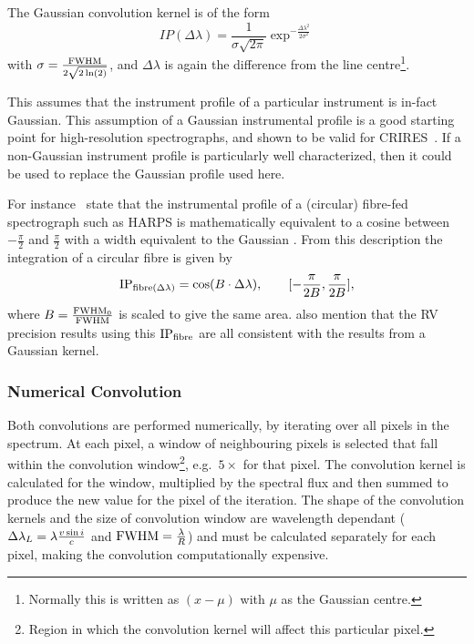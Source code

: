 The Gaussian convolution kernel is of the form
\begin{equation}
IP(\Delta\lambda) = \frac{1}{\sigma \sqrt{2\pi}} \exp^{-\frac{{\Delta\lambda}^{2}}{2 {\sigma}^{2}}}
\label{eqn:IP_profile}
\end{equation}
with $\sigma = \frac{\textrm{FWHM}}{2\sqrt{2 \ln(2)}}$, and $\Delta \lambda$ is again the difference from the line centre\footnote{Normally this is written as $(x-\mu)$ with $\mu$ as the Gaussian centre.}.

This assumes that the instrument profile of a particular instrument is in-fact Gaussian.
This assumption of a Gaussian instrumental profile is a good starting point for high-resolution spectrographs, and shown to be valid for CRIRES~\citep{seifahrt_synthesising_2010}.
If a non-Gaussian instrument profile is particularly well characterized, then it could be used to replace the Gaussian profile used here.

For instance~\citet{artigau_optical_2018} state that the instrumental profile of a (circular) fibre-fed spectrograph such as {HARPS} is mathematically equivalent to a cosine between $-\frac{\pi}{2}$ and $\frac{\pi}{2}$ with a width equivalent to the Gaussian {\fwhm}.
From this description the integration of a circular fibre is given by
\begin{equation}
\textrm{IP}{}_{\textrm{fibre}(\Delta\lambda)} = \cos(B\cdot\Delta\lambda),  \hspace{2em} [-\frac{\pi}{2 B}, \frac{\pi}{2 B}],
\end{equation}
where {$B = \frac{\textrm{FWHM}_{0}}{\textrm{FWHM}}$ } is scaled to give the same area.
\citet{artigau_optical_2018} also mention that the RV precision results using this $\textrm{IP}{}_{\textrm{fibre}}$ are all consistent with the results from a Gaussian kernel.

\subsubsection*{Numerical Convolution}
\label{subsubsec:numerical_convolution}
Both convolutions are performed numerically, by iterating over all pixels in the spectrum.
At each pixel, a window of neighbouring pixels is selected that fall within the convolution window\footnote{Region in which the convolution kernel will affect this particular pixel.}, e.g.\ \(5\times\)\fwhm{} for that pixel.
The convolution kernel is calculated for the window, multiplied by the spectral flux and then summed to produce the new value for the pixel of the iteration.
The shape of the convolution kernels and the size of convolution window are wavelength dependant (\(\Delta\lambda_{L}=\lambda \frac{v\sin{i}}{c}\) and \({\textrm{FWHM}}=\frac{\lambda}{R}\)) and must be calculated separately for each pixel, making the convolution computationally expensive.

